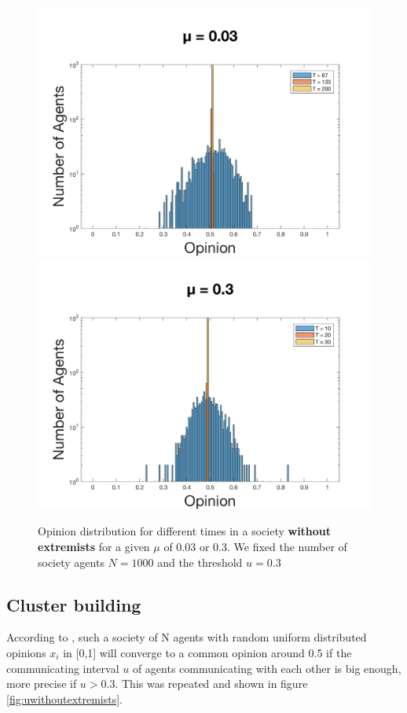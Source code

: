 \documentclass[11pt]{article}
\begin{document}
\begin{figure}[!htb]
  \includegraphics[width=\linewidth]{gen_plot_2017121813322472200e+01.png}
\endminipage\hfill
{}
  \includegraphics[width=\linewidth]{gen_plot_2017121813324648428e+00.png}
\endminipage
\caption{Opinion distribution for different times in a society \textbf{without extremists} for a given $\mu$ of 0.03 or 0.3. We fixed the number of society agents $N = 1000$ and the threshold $u = 0.3$}
\label{fig:muwithoutextremists}
\end{figure}


\subsection{Cluster building}
According to \cite{Minor}, such a society of N agents with random uniform distributed opinions $x_i$ in [0,1] will converge to a common opinion around 0.5 if the communicating interval $u$ of agents communicating with each other is big enough, more precise if $u>0.3$. This was repeated and shown in figure \ref{fig:uwithoutextremists}. \\
\end{document}
